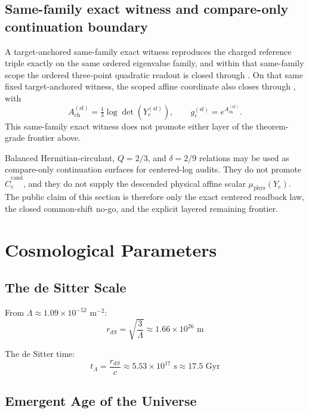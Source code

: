 \subsection{Same-family exact witness and compare-only continuation boundary}\label{134-the-koide-phase-from-oph}

A target-anchored same-family exact witness reproduces the charged reference triple exactly on the same ordered eigenvalue family, and within that same-family scope the ordered three-point quadratic readout is closed through . On that same fixed target-anchored witness, the scoped affine coordinate also closes through , with
\[
A_{\mathrm{ch}}^{(\mathrm{sf})}
=
\tfrac13\log\det(Y_e^{(\mathrm{sf})}),
\qquad
g_e^{(\mathrm{sf})}
=
e^{A_{\mathrm{ch}}^{(\mathrm{sf})}}.
\]
This same-family exact witness does not promote either layer of the theorem-grade frontier above.

Balanced Hermitian-circulant, \(Q=2/3\), and \(\delta=2/9\) relations may be used as compare-only continuation surfaces for centered-log audits. They do not promote \(\widehat C_e^{\mathrm{cand}}\), and they do not supply the descended physical affine scalar \(\mu_{\mathrm{phys}}(Y_e)\). The public claim of this section is therefore only the exact centered readback law, the closed common-shift no-go, and the explicit layered remaining frontier.

\section{Cosmological Parameters}\label{14-cosmological-parameters}

\subsection{The de Sitter Scale}\label{141-the-de-sitter-scale}

From \(\Lambda \approx 1.09 \times 10^{-52}\) m\(^{-2}\): \[r_{dS} = \sqrt{\frac{3}{\Lambda}} \approx 1.66 \times 10^{26} \text{ m}\]

The de Sitter time: \[t_\Lambda = \frac{r_{dS}}{c} \approx 5.53 \times 10^{17} \text{ s} \approx 17.5 \text{ Gyr}\]

\subsection{Emergent Age of the Universe}\label{142-emergent-age-of-the-universe}

